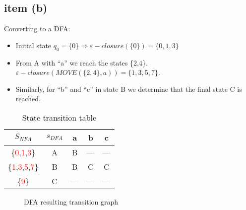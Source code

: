 \documentclass[11pt]{article}
\begin{document}
\subsection*{item (b)}

Converting to a DFA:

\begin{itemize}

\item Initial state $q_{0} = \{0\} \Rightarrow \varepsilon-closure(\{0\}) = \{0, 1, 3\}$ 

\item From A with ``a'' we reach the states \{2,4\}. $\varepsilon-closure \left(MOVE\left( \{2,4\}, a \right) \right) = \{1,3,5,7\}$.

\item Similarly, for ``b'' and ``c'' in state B we determine that the final state C is reached.

\end{itemize}

\begin{table}[H]
\centering
\begin{tabular}{c c c c c}
$S_{NFA}$ & $s_{DFA}$ & a & b & c \\
\hline
\{\textcolor{red}{0},\textcolor{red}{1},\textcolor{red}{3}\}  & A        & B & --- & --- \\
\{\textcolor{red}{1},\textcolor{red}{3},\textcolor{red}{5},\textcolor{red}{7}\}& B        & B & C   & C   \\
\{\textcolor{red}{9}\}      & C        & --- & --- & --- \\
\hline  
\end{tabular}
\caption{State transition table}
\end{table}

\begin{figure}[H]
\centering
{}
\caption{DFA resulting transition graph}
\end{figure}
\end{document}
